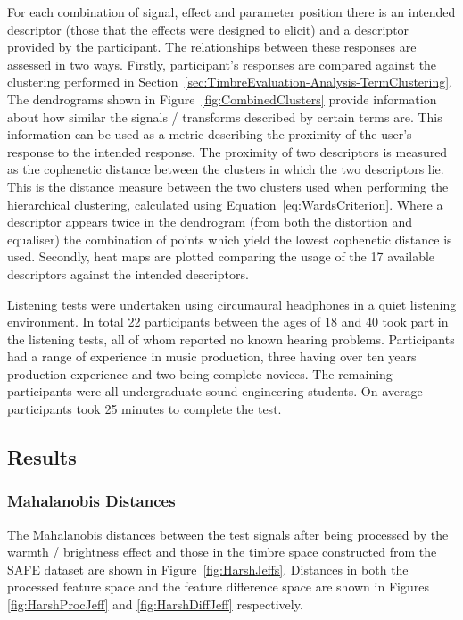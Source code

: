 			For each combination of signal, effect and parameter position there is an intended descriptor
			(those that the effects were designed to elicit) and a descriptor provided by the participant. The
			relationships between these responses are assessed in two ways. Firstly, participant's responses
			are compared against the clustering performed in
			Section~\ref{sec:TimbreEvaluation-Analysis-TermClustering}. The dendrograms shown in
			Figure~\ref{fig:CombinedClusters} provide information about how similar the signals / transforms
			described by certain terms are. This information can be used as a metric describing the proximity
			of the user's response to the intended response. The proximity of two descriptors is measured as
			the cophenetic distance between the clusters in which the two descriptors lie. This is the distance
			measure between the two clusters used when performing the hierarchical clustering, calculated using
			Equation~\ref{eq:WardsCriterion}. Where a descriptor appears twice in the dendrogram (from both the
			distortion and equaliser) the combination of points which yield the lowest cophenetic distance is
			used. Secondly, heat maps are plotted comparing the usage of the 17 available descriptors against
			the intended descriptors.

			Listening tests were undertaken using circumaural headphones in a quiet listening environment. In
			total 22 participants between the ages of 18 and 40 took part in the listening tests, all of whom
			reported no known hearing problems. Participants had a range of experience in music production,
			three having over ten years production experience and two being complete novices. The remaining
			participants were all undergraduate sound engineering students. On average participants took 25
			minutes to complete the test.

	\subsection{Results}
	\label{sec:PerceptualExperiments-SemanticControl-Results}
		\subsubsection{Mahalanobis Distances}
			The Mahalanobis distances between the test signals after being processed by the warmth / brightness
			effect and those in the timbre space constructed from the SAFE dataset are shown in
			Figure~\ref{fig:HarshJeffs}. Distances in both the processed feature space and the feature
			difference space are shown in Figures \ref{fig:HarshProcJeff} and \ref{fig:HarshDiffJeff}
			respectively.

